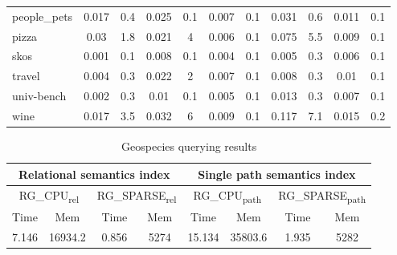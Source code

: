 {\begin{table}[h]
\begin{tabular}{| l | c  c | c  c | c  c | c  c | c  c |}
people\_pets                & 0.017 & 0.4  & 0.025 & 0.1 & 0.007 & 0.1      & 0.031 & 0.6  & 0.011 & 0.1  \\
pizza                       & 0.03  & 1.8  & 0.021 & 4   & 0.006 & 0.1      & 0.075 & 5.5  & 0.009 & 0.1  \\
skos                        & 0.001 & 0.1  & 0.008 & 0.1 & 0.004 & 0.1      & 0.005 & 0.3  & 0.006 & 0.1  \\
travel                      & 0.004 & 0.3  & 0.022 & 2   & 0.007 & 0.1      & 0.008 & 0.3  & 0.01  & 0.1  \\
univ-bench                  & 0.002 & 0.3  & 0.01  & 0.1 & 0.005 & 0.1      & 0.013 & 0.3  & 0.007 & 0.1  \\
wine                        & 0.017 & 3.5  & 0.032 & 6   & 0.009 & 0.1      & 0.117 & 7.1  & 0.015 & 0.2  \\
    \hline
  \end{tabular}
\end{table}
}


{\setlength{\tabcolsep}{2pt}
\begin{table}[h]
\caption{Geospecies querying results}
\label{tbl:tableGeospeciesResults}
\begin{tabular}{| c  c | c  c | c  c | c  c |}
    \hline

    \multicolumn{4}{|c|}{Relational semantics index}	&	\multicolumn{4}{|c|}{Single path semantics index} \\

    \hline


    \multicolumn{2}{|c|}{RG\_CPU\textsubscript{rel}}	&	\multicolumn{2}{|c|}{RG\_SPARSE\textsubscript{rel}} & \multicolumn{2}{|c|}{RG\_CPU\textsubscript{path}}	&	\multicolumn{2}{|c|}{RG\_SPARSE\textsubscript{path}}	 \\
    \hline
    Time & Mem & Time & Mem & Time & Mem & Time & Mem \\
    \hline
    \hline
    7.146 & 16934.2 & 0.856 & 5274 & 15.134 & 35803.6 & 1.935 & 5282   \\
    \hline
  \end{tabular}
\end{table}
}


